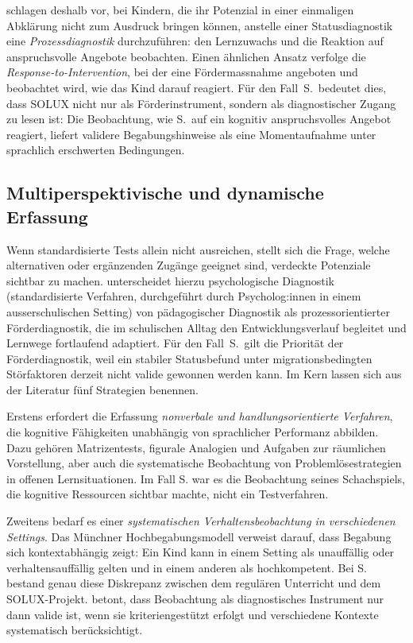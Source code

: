 \documentclass[ngerman, a4paper]{article}
\begin{document}
\textcite[S.\,239--251]{gauckreimann2021psychdiagnostik} schlagen deshalb
vor, bei Kindern, die ihr Potenzial in einer einmaligen Abklärung nicht zum
Ausdruck bringen können, anstelle einer Statusdiagnostik eine
\textit{Prozessdiagnostik} durchzuführen: den Lernzuwachs und die Reaktion
auf anspruchsvolle Angebote beobachten. Einen ähnlichen Ansatz verfolge die
\textit{Response-to-Intervention}, bei der eine Fördermassnahme angeboten
und beobachtet wird, wie das Kind darauf reagiert. Für den Fall~S.\ bedeutet
dies, dass SOLUX nicht nur als Förderinstrument, sondern als diagnostischer
Zugang zu lesen ist: Die Beobachtung, wie S.\ auf ein kognitiv
anspruchsvolles Angebot reagiert, liefert validere Begabungshinweise als
eine Momentaufnahme unter sprachlich erschwerten Bedingungen.

\subsection{Multiperspektivische und dynamische Erfassung}

Wenn standardisierte Tests allein nicht ausreichen, stellt sich die Frage, welche
alternativen oder ergänzenden Zugänge geeignet sind, verdeckte Potenziale sichtbar
zu machen. \textcite[S.\,224--238]{muelleroppliger2021paeddiagnostik} unterscheidet
hierzu psychologische Diagnostik (standardisierte Verfahren, durchgeführt durch
Psycholog:innen in einem ausserschulischen Setting) von pädagogischer Diagnostik
als prozessorientierter Förderdiagnostik, die im schulischen Alltag den
Entwicklungsverlauf begleitet und Lernwege fortlaufend adaptiert. Für den Fall~S.\
gilt die Priorität der Förderdiagnostik, weil ein stabiler Statusbefund unter
migrationsbedingten Störfaktoren derzeit nicht valide gewonnen werden kann.
Im Kern lassen sich aus der Literatur fünf Strategien benennen.

Erstens erfordert die Erfassung \textit{nonverbale und handlungsorientierte Verfahren}, die
kognitive Fähigkeiten unabhängig von sprachlicher Performanz abbilden. Dazu gehören
Matrizentests, figurale Analogien und Aufgaben zur räumlichen Vorstellung, aber auch
die systematische Beobachtung von Problemlösestrategien in offenen Lernsituationen.
Im Fall S. war es die Beobachtung seines Schachspiels, die kognitive Ressourcen sichtbar
machte, nicht ein Testverfahren.

Zweitens bedarf es einer \textit{systematischen Verhaltensbeobachtung in verschiedenen
Settings}. Das Münchner Hochbegabungsmodell verweist darauf, dass Begabung sich
kontextabhängig zeigt: Ein Kind kann in einem Setting als unauffällig oder
verhaltensauffällig gelten und in einem anderen als hochkompetent. Bei S. bestand genau
diese Diskrepanz zwischen dem regulären Unterricht und dem SOLUX-Projekt.
\textcite[S.\,34--41]{trautmann2016einfuehrung} betont, dass Beobachtung als diagnostisches Instrument nur dann valide
ist, wenn sie kriteriengestützt erfolgt und verschiedene Kontexte systematisch
berücksichtigt.
\end{document}
